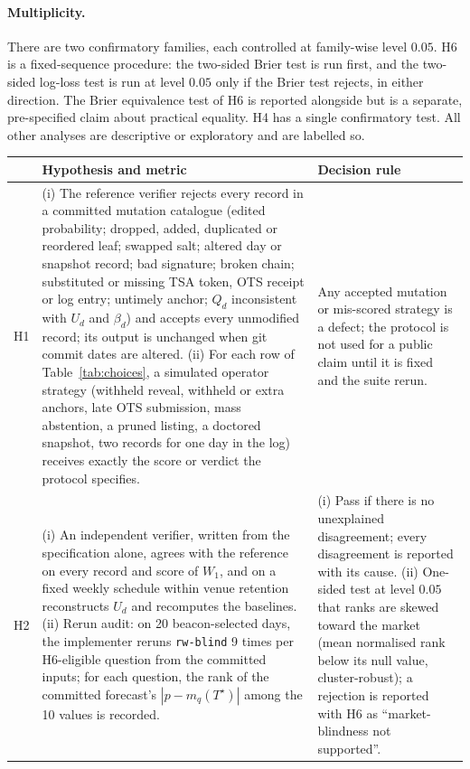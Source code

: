 \documentclass[11pt]{article}
\newcommand{\Ts}{T^{\star}}
\begin{document}
\paragraph{Multiplicity.} There are two confirmatory families, each controlled at family-wise level $0.05$. H6 is a fixed-sequence procedure: the two-sided Brier test is run first, and the two-sided log-loss test is run at level $0.05$ only if the Brier test rejects, in either direction. The Brier equivalence test of H6 is reported alongside but is a separate, pre-specified claim about practical equality. H4 has a single confirmatory test. All other analyses are descriptive or exploratory and are labelled so.

\begin{table}[t]
\centering
\small
\begin{tabularx}{\textwidth}{@{}l>{\raggedright\arraybackslash}X>{\raggedright\arraybackslash}X@{}}
\toprule
 & Hypothesis and metric & Decision rule \\
\midrule
H1 & (i) The reference verifier rejects every record in a committed mutation catalogue (edited probability; dropped, added, duplicated or reordered leaf; swapped salt; altered day or snapshot record; bad signature; broken chain; substituted or missing TSA token, OTS receipt or log entry; untimely anchor; $Q_d$ inconsistent with $U_d$ and $\beta_d$) and accepts every unmodified record; its output is unchanged when git commit dates are altered. (ii) For each row of Table~\ref{tab:choices}, a simulated operator strategy (withheld reveal, withheld or extra anchors, late OTS submission, mass abstention, a pruned listing, a doctored snapshot, two records for one day in the log) receives exactly the score or verdict the protocol specifies. & Any accepted mutation or mis-scored strategy is a defect; the protocol is not used for a public claim until it is fixed and the suite rerun. \\
H2 & (i) An independent verifier, written from the specification alone, agrees with the reference on every record and score of $W_1$, and on a fixed weekly schedule within venue retention reconstructs $U_d$ and recomputes the baselines. (ii) Rerun audit: on 20 beacon-selected days, the implementer reruns \texttt{rw-blind} 9 times per H6-eligible question from the committed inputs; for each question, the rank of the committed forecast's $|p - m_q(\Ts)|$ among the 10 values is recorded. & (i) Pass if there is no unexplained disagreement; every disagreement is reported with its cause. (ii) One-sided test at level $0.05$ that ranks are skewed toward the market (mean normalised rank below its null value, cluster-robust); a rejection is reported with H6 as ``market-blindness not supported''. \\

\end{tabularx}
\end{table}
\end{document}
